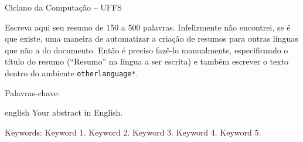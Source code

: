 \documentclass[serif, brazilian]{uffstex}
\begin{document}

\pretextual%

\imprimircapa%

\imprimirfolhaderosto*%


                         {Ciclano da Computação -- UFFS}

\begin{resumo}
  Escreva aqui seu resumo de 150 a 500 palavras.
  Infelizmente não encontrei, se é que existe, uma maneira de automatizar
  a criação de resumos para outras línguas que não a do documento.
  Então é preciso fazê-lo manualmente, especificando o título do resumo
  (\enquote{Resumo} na língua a ser escrita) e também escrever o texto dentro
  do ambiente \texttt{otherlanguage*}.

  \vspace{\baselineskip}

  Palavras-chave: \imprimirpcs
\end{resumo}

\begin{resumo}[Abstract]
  \begin{otherlanguage*}{english}
    Your abstract in English.

    \vspace{\baselineskip}

    Keywords: Keyword 1. Keyword 2. Keyword 3. Keyword 4. Keyword 5.
  \end{otherlanguage*}
\end{resumo}

\listoffigures*
\cleardoublepage%

\pdfbookmark{\listalgoritmoname}{\algoritmoext}
\listofalgoritmos*
\cleardoublepage%

\listoftables*
\cleardoublepage%
\end{document}
